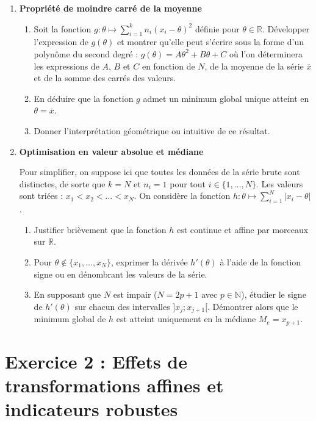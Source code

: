 \documentclass[11pt,a4paper]{article}
\begin{document}
\begin{enumerate}
    \item \textbf{Propriété de moindre carré de la moyenne}
    \begin{enumerate}
        \item Soit la fonction $g : \theta \mapsto \sum_{i=1}^{k} n_{i}(x_{i}-\theta)^{2}$ définie pour $\theta \in \mathbb{R}$. Développer l'expression de $g(\theta)$ et montrer qu'elle peut s'écrire sous la forme d'un polynôme du second degré : $g(\theta) = A\theta^2 + B\theta + C$ où l'on déterminera les expressions de $A$, $B$ et $C$ en fonction de $N$, de la moyenne de la série $\overline{x}$ et de la somme des carrés des valeurs.
        \item En déduire que la fonction $g$ admet un minimum global unique atteint en $\theta = \overline{x}$.
        \item Donner l'interprétation géométrique ou intuitive de ce résultat.
    \end{enumerate}

    \item \textbf{Optimisation en valeur absolue et médiane}
    
    Pour simplifier, on suppose ici que toutes les données de la série brute sont distinctes, de sorte que $k = N$ et $n_i = 1$ pour tout $i \in \{1, \dots, N\}$. Les valeurs sont triées : $x_1 < x_2 < \dots < x_N$.
    On considère la fonction $h : \theta \mapsto \sum_{i=1}^{N} |x_{i}-\theta|$.
    \begin{enumerate}
        \item Justifier brièvement que la fonction $h$ est continue et affine par morceaux sur $\mathbb{R}$.
        \item Pour $\theta \notin \{x_1, \dots, x_N\}$, exprimer la dérivée $h'(\theta)$ à l'aide de la fonction signe ou en dénombrant les valeurs de la série.
        \item En supposant que $N$ est impair ($N = 2p+1$ avec $p \in \mathbb{N}$), étudier le signe de $h'(\theta)$ sur chacun des intervalles $]x_j ; x_{j+1}[$. Démontrer alors que le minimum global de $h$ est atteint uniquement en la médiane $M_e = x_{p+1}$.
    \end{enumerate}
\end{enumerate}

\newpage

\section*{Exercice 2 : Effets de transformations affines et indicateurs robustes}
\end{document}
